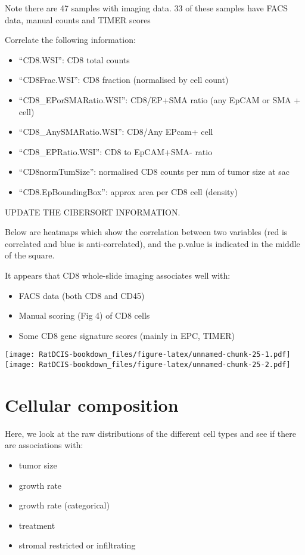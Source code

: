 \documentclass[
]{book}
\providecommand{\tightlist}{%
  \setlength{\itemsep}{0pt}\setlength{\parskip}{0pt}}
\begin{document}
Note there are 47 samples with imaging data. 33 of these samples have FACS data, manual counts and TIMER scores

Correlate the following information:

\begin{itemize}
\tightlist
\item
  ``CD8.WSI'': CD8 total counts
\item
  ``CD8Frac.WSI'': CD8 fraction (normalised by cell count)
\item
  ``CD8\_EPorSMARatio.WSI'': CD8/EP+SMA ratio (any EpCAM or SMA + cell)
\item
  ``CD8\_AnySMARatio.WSI'': CD8/Any EPcam+ cell
\item
  ``CD8\_EPRatio.WSI'': CD8 to EpCAM+SMA- ratio
\item
  ``CD8normTumSize'': normalised CD8 counts per mm of tumor size at sac
\item
  ``CD8.EpBoundingBox'': approx area per CD8 cell (density)
\end{itemize}

{
UPDATE THE CIBERSORT INFORMATION. }

Below are heatmaps which show the correlation between two variables (red is correlated and blue is anti-correlated), and the p.value is indicated in the middle of the square.

It appears that CD8 whole-slide imaging associates well with:

\begin{itemize}
\tightlist
\item
  FACS data (both CD8 and CD45)
\item
  Manual scoring (Fig 4) of CD8 cells
\item
  Some CD8 gene signature scores (mainly in EPC, TIMER)
\end{itemize}

\texttt{[image: RatDCIS-bookdown\_files/figure-latex/unnamed-chunk-25-1.pdf]} \texttt{[image: RatDCIS-bookdown\_files/figure-latex/unnamed-chunk-25-2.pdf]}

\hypertarget{cellular-composition}{%
\section{Cellular composition}\label{cellular-composition}}

Here, we look at the raw distributions of the different cell types and see if there are associations with:

\begin{itemize}
\tightlist
\item
  tumor size
\item
  growth rate
\item
  growth rate (categorical)
\item
  treatment
\item
  stromal restricted or infiltrating
\end{itemize}
\end{document}
